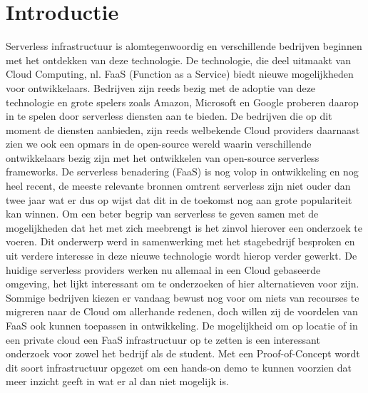 
\section{Introductie} %
\label{sec:introductie}

Serverless infrastructuur is alomtegenwoordig en verschillende bedrijven beginnen met het ontdekken van deze technologie. De technologie, die deel uitmaakt van Cloud Computing, nl. FaaS (Function as a Service)  biedt nieuwe mogelijkheden voor ontwikkelaars. Bedrijven zijn reeds bezig met de adoptie van deze technologie en grote spelers zoals Amazon, Microsoft en Google proberen daarop in te spelen door serverless diensten aan te bieden. De bedrijven die op dit moment de diensten aanbieden, zijn reeds welbekende Cloud providers daarnaast zien we ook een opmars in de open-source wereld waarin verschillende ontwikkelaars bezig zijn met het ontwikkelen van open-source serverless frameworks.
\newline
\newline
De serverless benadering (FaaS) is nog volop in ontwikkeling en nog heel recent, de meeste relevante bronnen omtrent serverless zijn niet ouder dan twee jaar wat er dus op wijst dat dit in de toekomst nog aan grote populariteit kan winnen. Om een beter begrip van serverless te geven samen met de mogelijkheden dat het met zich meebrengt is het zinvol hierover een onderzoek te voeren. 
\newline
\newline
Dit onderwerp werd in samenwerking met het stagebedrijf besproken en uit verdere interesse in deze nieuwe technologie wordt hierop verder gewerkt. De huidige serverless providers werken nu allemaal in een Cloud gebaseerde omgeving, het lijkt interessant om te onderzoeken of hier alternatieven voor zijn. Sommige bedrijven kiezen er vandaag bewust nog voor om niets van recourses te migreren naar de Cloud om allerhande redenen, doch willen zij de voordelen van FaaS ook kunnen toepassen in ontwikkeling. De mogelijkheid om op locatie of in een private cloud een FaaS infrastructuur op te zetten is een interessant onderzoek voor zowel het bedrijf als de student. Met een Proof-of-Concept wordt dit soort infrastructuur opgezet om een hands-on demo te kunnen voorzien dat meer inzicht geeft in wat er al dan niet mogelijk is.
